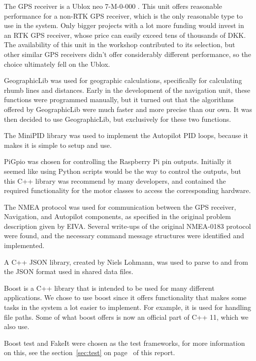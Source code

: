 The GPS receiver is a Ublox neo 7-M-0-000 \cite{ublox-datasheet}. This unit offers reasonable performance for a non-RTK GPS receiver, which is the only reasonable type to use in the system. Only bigger projects with a lot more funding would invest in an RTK GPS receiver, whose price can easily exceed tens of thousands of DKK. The availability of this unit in the workshop contributed to its selection, but other similar GPS receivers didn't offer considerably different performance, so the choice ultimately fell on the Ublox.

GeographicLib\cite{geographiclib} was used for geographic calculations, specifically for calculating rhumb lines and distances. Early in the development of the navigation unit, these functions were programmed manually, but it turned out that the algorithms offered by GeographicLib were much faster and more precise than our own. It was then decided to use GeographicLib, but exclusively for these two functions.

The MiniPID \cite{minipid} library was used to implement the Autopilot PID loops, because it makes it is simple to setup and use.

PiGpio \cite{pigpio} was chosen for controlling the Raspberry Pi pin outputs. Initially it seemed like using Python scripts would be the way to control the outputs, but this C++ library was recommend by many developers, and contained the required functionality for the motor classes to access the corresponding hardware.

The NMEA \cite{NMEA} protocol was used for communication between the GPS receiver, Navigation, and Autopilot components, as specified in the original problem description given by EIVA. Several write-ups of the original NMEA-0183 protocol were found, and the necessary command message structures were identified and implemented.

A C++ JSON library, created by Niels Lohmann\cite{json}, was used to parse to and from the JSON format\cite{jsobjectnotation} used in shared data files.

Boost is a C++ library that is intended to be used for many different applications\cite{boost}. We chose to use boost since it offers functionality that makes some tasks in the system a lot easier to implement. For example, it is used for handling file paths. Some of what boost offers is now an official part of C++ 11, which we also use.

Boost test and FakeIt \cite{fakeit} were chosen as the test frameworks, for more information on this, see the section~\ref{sec:test} on page~\pageref{sec:test} of this report.